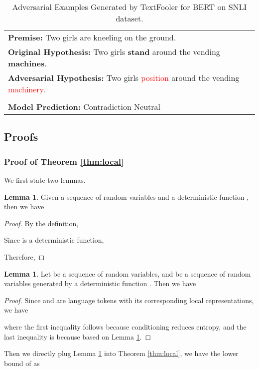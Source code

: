 \documentclass{article} \usepackage{iclr2021_conference,times}
\theoremstyle{definition}
\newtheorem{lemma}[theorem]{Lemma}
\theoremstyle{remark}
\begin{document}
\begin{table}[htp!]
\begin{tabular}{p{13.8cm}}
\textbf{Premise:} Two girls are kneeling on the ground. \\
\textbf{Original Hypothesis: } Two girls \textbf{stand} around the vending \textbf{machines}.\\
\textbf{Adversarial Hypothesis: } Two girls \textcolor{red}{position} around the vending \textcolor{red}{machinery}. \\
\\
\textbf{Model Prediction: } Contradiction  Neutral \\
\bottomrule
\end{tabular}
\caption{Adversarial Examples Generated by TextFooler for BERT on SNLI dataset.}
\label{tab:ablation_eg}
\end{table}




\clearpage
\subsection{Proofs}
\subsubsection{Proof of Theorem \ref{thm:local}}
We first state two lemmas.
\begin{lemma}\label{lem:mi}
Given a sequence of random variables  and a deterministic function , then  we have 

\end{lemma}
\begin{proof}
By the definition,


Since  is a deterministic function, 

Therefore, 

\end{proof}

\begin{lemma} \label{lem:local} Let  be a sequence of random variables, and  be a sequence of random variables generated by a deterministic function .  Then we have 


\end{lemma}
\begin{proof}
Since  and  are language tokens with its corresponding local representations, we have 

where the first inequality follows because conditioning reduces entropy, and the last inequality is because  based on Lemma \ref{lem:mi}.
\end{proof}
Then we directly plug Lemma \ref{lem:local} into Theorem \ref{thm:local}, we have the lower bound of  as
\end{document}
